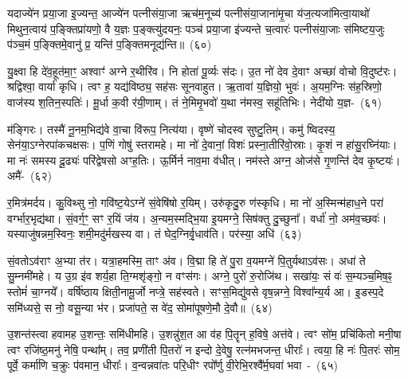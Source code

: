 यदाज्ये॑न प्रया॒जा इ॒ज्यन्त॒ आज्ये॑न पत्नीसंया॒जा ऋच॑म॒नूच्य॑ पत्नीसंया॒जाना॑मृ॒चा य॑ज॒त्यजा॑मित्वा॒याथो॑ मिथुन॒त्वाय॑ प॒ङ्क्तिप्रा॑यणो॒ वै य॒ज्ञः प॒ङ्क्त्यु॑दयनः॒ पञ्च॑ प्रया॒जा इ॑ज्यन्ते च॒त्वारः॑ पत्नीसंया॒जाः स॑मिष्टय॒जुः प॑ञ्च॒मं प॒ङ्क्तिमे॒वानु॑ प्र॒ यन्ति॑ प॒ङ्क्तिमनूद्य॑न्ति॥~(६०)\ip

{\anuvakamend[{प्र॒जायाः᳚ करोति॒ तत्क्रि॑यते॒ त्रय॑स्त्रिꣳशच्च}]}%

यु॒क्ष्वा हि दे॑व॒हूत॑मा॒ꣳ॒ अश्वाꣳ॑ अग्ने र॒थीरि॑व। नि होता॑ पू॒र्व्यः स॑दः। उ॒त नो॑ देव दे॒वाꣳ अच्छा॑ वोचो वि॒दुष्ट॑रः। श्रद्विश्वा॒ वार्या॑ कृधि। त्वꣳ ह॒ यद्य॑विष्ठ्य॒ सह॑सः सूनवाहुत। ऋ॒तावा॑ य॒ज्ञियो॒ भुवः॑। अ॒यम॒ग्निः स॑ह॒स्रिणो॒ वाज॑स्य श॒तिन॒स्पतिः॑। मू॒र्धा क॒वी र॑यी॒णाम्। तं ने॒मिमृ॒भवो॑ य॒था न॑मस्व॒ सहू॑तिभिः। नेदी॑यो य॒ज्ञ-~(६१)\ip

म॑ङ्गिरः। तस्मै॑ नू॒नम॒भिद्य॑वे वा॒चा वि॑रूप॒ नित्य॑या। वृष्णे॑ चोदस्व सुष्टु॒तिम्। कमु॑ ष्विदस्य॒ सेन॑या॒\-ऽग्नेरपा॑कचक्षसः। प॒णिं गोषु॑ स्तरामहे। मा नो॑ दे॒वानां॒ विशः॑ प्रस्ना॒तीरि॑वो॒स्राः। कृ॒शं न हा॑सु॒रघ्नि॑याः। मा नः॑ समस्य दू॒ढ्यः॑ परि॑द्वेषसो अꣳह॒तिः। ऊ॒र्मिर्न नाव॒मा व॑धीत्। नम॑स्ते अग्न॒ ओज॑से गृ॒णन्ति॑ देव कृ॒ष्टयः॑। अमै॑-~(६२)\ip

र॒मित्र॑मर्दय। कु॒विथ्सु नो॒ गवि॑ष्ट॒ये\-ऽग्ने॑ सं॒वेषि॑षो र॒यिम्। उरु॑कृदु॒रु ण॑स्कृधि। मा नो॑ अ॒स्मिन्म॑हाध॒ने परा॑ वर्ग्भार॒भृद्य॑था। सं॒वर्ग॒ꣳ॒ सꣳ र॒यिं ज॑य। अ॒न्यम॒स्मद्भि॒या इ॒यमग्ने॒ सिष॑क्तु दु॒च्छुना᳚। वर्धा॑ नो॒ अम॑व॒च्छवः॑। यस्याजु॑षन्नम॒स्विनः॒ शमी॒मदु॑र्मखस्य वा। तं घेद॒ग्निर्वृ॒धाव॑ति। पर॑स्या॒ अधि॑~(६३)\ip

सं॒वतो\-ऽव॑राꣳ अ॒भ्या त॑र। यत्रा॒हमस्मि॒ ताꣳ अ॑व। वि॒द्मा हि ते॑ पु॒रा व॒यमग्ने॑ पि॒तुर्यथाऽव॑सः। अधा॑ ते सु॒म्नमी॑महे। य उ॒ग्र इ॑व शर्य॒हा ति॒ग्मशृ॑ङ्गो॒ न वꣳस॑गः। अग्ने॒ पुरो॑ रु॒रोजि॑थ। सखा॑यः॒ सं वः॑ स॒म्यञ्च॒मिष॒ꣴ॒ स्तोमं॑ चा॒ग्नये᳚। वर्\mbox{}षि॑ष्ठाय क्षिती॒नामू॒र्जो नप्त्रे॒ सह॑\-स्वते। सꣳस॒मिद्यु॑वसे वृष॒न्नग्ने॒ विश्वा᳚न्य॒र्य आ। इ॒डस्प॒दे समि॑ध्यसे॒ स नो॒ वसू॒न्या भ॑र। प्रजा॑पते॒ स वे॑द॒ सोमा॑पूषणे॒मौ दे॒वौ॥~(६४)\ip

{\anuvakamend[{य॒ज्ञममै॒रधि॑ वृष॒न्नेका॒न्नविꣳ॑श॒तिश्च॑}]}%

उ॒शन्त॑स्त्वा हवामह उ॒शन्तः॒ समि॑धीमहि। उ॒शन्नु॑श॒त आ व॑ह पि॒तॄन् ह॒विषे॒ अत्त॑वे। त्वꣳ सो॑म॒ प्रचि॑कितो मनी॒षा त्वꣳ रजि॑ष्ठ॒मनु॑ नेषि॒ पन्था᳚म्। तव॒ प्रणी॑ती पि॒तरो॑ न इन्दो दे॒वेषु॒ रत्न॑मभजन्त॒ धीराः᳚। त्वया॒ हि नः॑ पि॒तरः॑ सोम॒ पूर्वे॒ कर्मा॑णि च॒क्रुः प॑वमान॒ धीराः᳚। व॒न्वन्नवा॑तः परि॒धीꣳ रपो᳚र्णु वी॒रेभि॒रश्वै᳚र्म॒घवा॑ भवा~-~(६५)\ip

